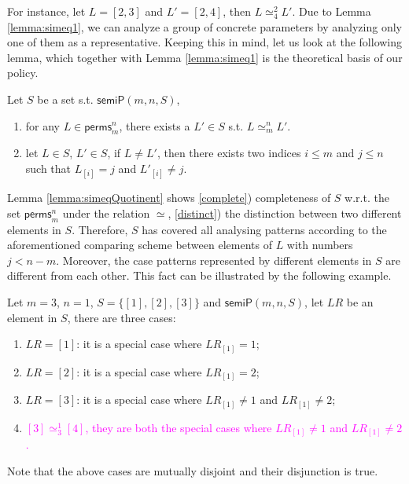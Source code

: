 \documentclass[conference]{IEEEtran}
\newcommand\lyj[1]{\textcolor{magenta}{ #1}}
\newcommand\cai[1]{\textcolor{blue}{ #1} }
\newcommand\caicomment[1]{\textcolor{red}{comment: #1} }
\begin{document}
For instance, let $L=[2,3]$ and $L'=[2,4]$, then $L \simeq_{4}^2 L' $. %
Due to Lemma \ref{lemma:simeq1},
we can analyze a group of concrete parameters by analyzing only one of them as a representative. Keeping this in mind, let us look at the following lemma, which together with Lemma \ref{lemma:simeq1} is the theoretical basis of our policy.


\begin{lemma}\label{lemma:simeqQuotinent}  Let $S $ be a set s.t.  $\mathsf{semiP}(m,n,S)$,
\begin{enumerate}
\item \label{complete}  for any $L \in \mathsf{perms}_{m}^{n}$, there exists a $L' \in S$ s.t. $L \simeq_m^n L'$.
\item \label{distinct} let $L \in S$, $L' \in S$, if $L \ne L'$, then there exists two indices $i \le m$ and $j \le n$ such that $L_{[i]}=j$ and $L'_{[i]}\ne j$.
\end{enumerate}
\end{lemma}

Lemma \ref{lemma:simeqQuotinent} shows \ref{complete}) completeness of $S$ w.r.t. the set $\mathsf{perms}_{m}^{n}$ under the relation $\simeq$, \ref{distinct})  the distinction between two different elements in $S$. Therefore, $S$ has covered all analysing patterns according to the aforementioned comparing scheme between elements of $L$ with numbers $j<n-m$. Moreover, the case patterns represented by different elements in $S$ are different from each other. This fact can be illustrated by the following example.
\begin{example}
Let $m=3$, $n=1$, $S=\{[1],[2],[3]\}$ and  $\mathsf{semiP}(m,n,S)$,  let $LR$ be an element in $S$, there are three cases:
\begin{enumerate}
\item $LR=[1]$: it is a special case where $LR_{[1]}=1 $;
\item $LR=[2]$: it is a special case where $LR_{[1]}=2 $;
\item $LR=[3]$: it is a special case where $LR_{[1]}\ne 1$ and $LR_{[1]}\ne 2$;
\item \lyj{$[3] \simeq_3^1 [4]$, they are both the special cases where $LR_{[1]}\ne 1$ and $LR_{[1]}\ne 2$.}
\end{enumerate}
\end{example}
Note that the above cases are mutually disjoint and their disjunction  is true.
\end{document}
